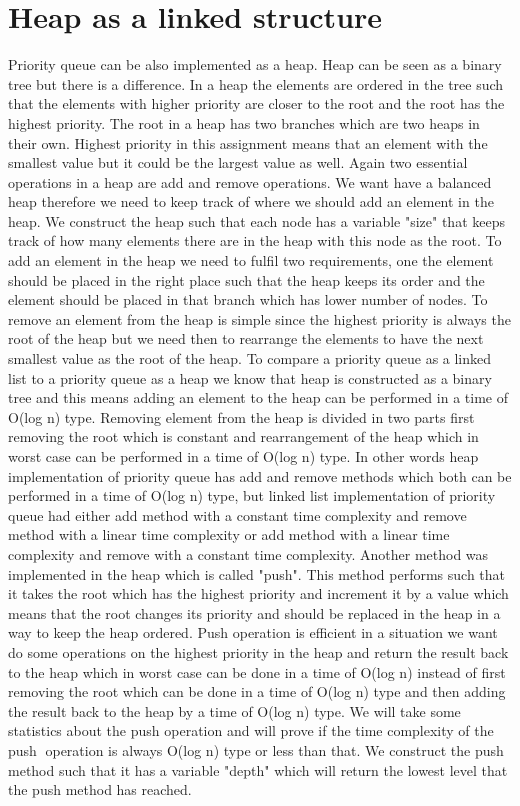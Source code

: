 \documentclass[a4paper,11pt]{article}
\begin{document}
\section*{Heap as a linked structure}
Priority queue can be also implemented as a heap. Heap can be seen as a binary tree but there is a difference. In a heap the elements are ordered in the tree such that the elements with higher priority are closer to the root and the root has the highest priority. The root in a heap has two branches which are two heaps in their own. Highest priority in this assignment means that an element with the smallest value but it could be the largest value as well. Again two essential operations in a heap are add and remove operations. We want have a balanced heap therefore we need to keep track of where we should add an element in the heap. We construct the heap such that each node has a variable "size" that keeps track of how many elements there are in the heap with this node as the root. To add an element in the heap we need to fulfil two requirements, one the element should be placed in the right place such that the heap keeps its order and the element should be placed in that branch which has lower number of nodes. To remove an element from the heap is simple since the highest priority is always the root of the heap but we need then to rearrange the elements to have the next smallest value as the root of the heap.\newline
To compare a priority queue as a linked list to a priority queue as a heap we know that heap is constructed as a binary tree and this means adding an element to the heap can be performed in a time of O(log n) type. Removing element from the heap is divided in two parts first removing the root which is constant and rearrangement of the heap which in worst case can be performed in a time of O(log n) type. In other words heap implementation of priority queue has add and remove methods which both can be performed in a time of O(log n) type, but linked list implementation of priority queue had either add method with a constant time complexity and remove method with a linear time complexity or add method with a linear time complexity and remove with a constant time complexity.\newline
Another method was implemented in the heap which is called "push". This method performs such that it takes the root which has the highest priority and increment it by a value which means that the root changes its priority and should be replaced in the heap in a way to keep the heap ordered. Push operation is efficient in a situation we want do some operations on the highest priority in the heap and return the result back to the heap which in worst case can be done in a time of O(log n) instead of first removing the root which can be done in a time of O(log n) type and then adding the result back to the heap by a time of O(log n) type. We will take some statistics about the push operation and will prove if the time complexity of the push operation is always O(log n) type or less than that. We construct the push method such that it has a variable "depth" which will return the lowest level that the push method has reached. \newline
\end{document}
